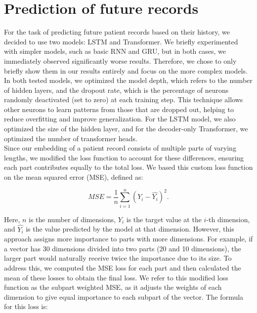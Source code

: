 
\section{Prediction of future records}
\label{recordPredImple}

For the task of predicting future patient records based on their history, we decided to use two models: LSTM and Transformer. We briefly experimented with simpler models, such as basic RNN and GRU, but in both cases, we immediately observed significantly worse results. Therefore, we chose to only briefly show them in our results entirely and focus on the more complex models.
\\

In both tested models, we optimized the model depth, which refers to the number of hidden layers, and the dropout rate, which is the percentage of neurons randomly deactivated (set to zero) at each training step. This technique allows other neurons to learn patterns from those that are dropped out, helping to reduce overfitting and improve generalization. For the LSTM model, we also optimized the size of the hidden layer, and for the decoder-only Transformer, we optimized the number of transformer heads.
\\  

Since our embedding of a patient record consists of multiple parts of varying lengths, we modified the loss function to account for these differences, ensuring each part contributes equally to the total loss. We based this custom loss function on the mean squared error (MSE), defined as:

\begin{equation}
	\label{eqn:mse}
	MSE = \frac{1}{n}\sum_{i=1}^{n}(Y_i-\hat{Y_i})^2.
\end{equation} 

Here, $n$ is the number of dimensions, $Y_i$ is the target value at the $i$-th dimension, and $\hat{Y_i}$ is the value predicted by the model at that dimension. However, this approach assigns more importance to parts with more dimensions. For example, if a vector has 30 dimensions divided into two parts (20 and 10 dimensions), the larger part would naturally receive twice the importance due to its size. To address this, we computed the MSE loss for each part and then calculated the mean of these losses to obtain the final loss. We refer to this modified loss function as the subpart weighted MSE, as it adjusts the weights of each dimension to give equal importance to each subpart of the vector. The formula for this loss is:

